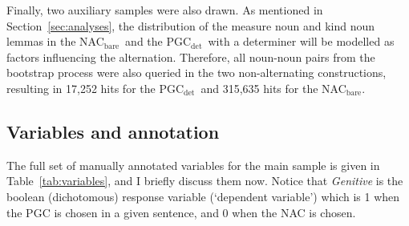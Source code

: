 \documentclass[USenglish]{article}
\newcommand{\Sub}[1]{\ensuremath{\mathrm{_{#1}}}}
\newcommand{\NACb}{NAC\Sub{bare}}
\newcommand{\PGCd}{PGC\Sub{det}}
\begin{document}
Finally, two auxiliary samples were also drawn.
As mentioned in Section~\ref{sec:analyses}, the distribution of the measure noun and kind noun lemmas in the \NACb\ and the \PGCd\ with a determiner will be modelled as factors influencing the alternation.
Therefore, all noun-noun pairs from the bootstrap process were also queried in the two non-alternating constructions, resulting in 17,252 hits for the \PGCd\ and 315,635 hits for the \NACb.



\subsection{Variables and annotation}
\label{sec:annotation}

The full set of manually annotated variables for the main sample is given in Table~\ref{tab:variables}, and I briefly discuss them now.
Notice that \textit{Genitive} is the boolean (dichotomous) response variable (`dependent variable') which is 1 when the PGC is chosen in a given sentence, and 0 when the NAC is chosen.
\end{document}
